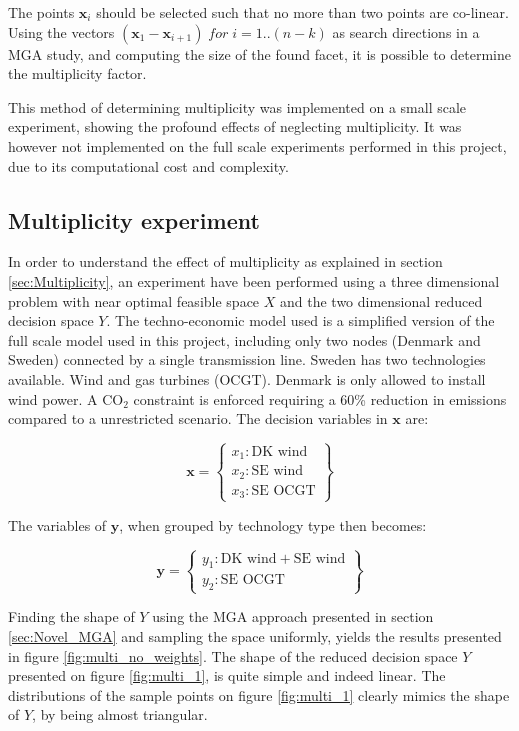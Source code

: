 The points $\mathbf{x}_i$ should be selected such that no more than two points are co-linear. Using the vectors  $(\mathbf{x}_1-\mathbf{x}_{i+1}) \; for \; i=1..(n-k)$ as search directions in a MGA study, and computing the size of the found facet, it is possible to determine the multiplicity factor. 

This method of determining multiplicity was implemented on a small scale experiment, showing the profound effects of neglecting multiplicity. It was however not implemented on the full scale experiments performed in this project, due to its computational cost and complexity.  


\subsection{Multiplicity experiment}

In order to understand the effect of multiplicity as explained in section \ref{sec:Multiplicity}, an experiment have been performed using a three dimensional problem with near optimal feasible space $X$ and the two dimensional reduced decision space $Y$. The techno-economic model used is a simplified version of the full scale model used in this project, including only two nodes (Denmark and Sweden) connected by a single transmission line. Sweden has two technologies available. Wind and gas turbines (OCGT). Denmark is only allowed to install wind power. A $\text{CO}_2$ constraint is enforced requiring a 60\% reduction in emissions compared to a unrestricted scenario.  The decision variables in $\mathbf{x}$ are:

\begin{equation}
\mathbf{x} = 
\begin{Bmatrix}
x_1: \text{DK wind} \\
x_2: \text{SE wind} \\
x_3: \text{SE OCGT}
\end{Bmatrix}
\end{equation}

The variables of $\mathbf{y}$, when grouped by technology type then becomes: 

\begin{equation}
\mathbf{y} = 
\begin{Bmatrix}
y_1: \text{DK wind} + \text{SE wind} \\
y_2: \text{SE OCGT}
\end{Bmatrix}
\end{equation}

Finding the shape of $Y$ using the MGA approach presented in section  \ref{sec:Novel_MGA} and sampling the space uniformly, yields the results presented in figure \ref{fig:multi_no_weights}. The shape of the reduced decision space $Y$ presented on figure \ref{fig:multi_1}, is quite simple and indeed linear. The distributions of the sample points on figure \ref{fig:multi_1} clearly mimics the shape of $Y$, by being almost triangular. 


